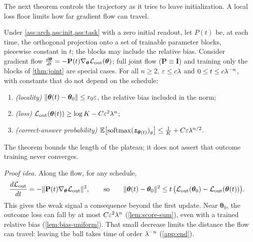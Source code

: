 The next theorem controls the trajectory as it tries to leave initialization. A local loss floor limits how far gradient flow can travel.

\begin{theorem}
\label{thm:outcome-end}
Under \cref{ass:arch,ass:init,ass:task} with a zero initial readout, let $P(t)$ be, at each time, the orthogonal projection onto a set
of trainable parameter blocks, piecewise constant in $t$; the blocks may include the relative bias. Consider gradient flow
$\tfrac{d\bm\theta}{dt}=-\mathbf P(t)\nabla_{\bm\theta}\Lout(\bm\theta)$; full joint flow ($\mathbf P\equiv\mathbf I$) and training only the blocks of \cref{thm:joint} are special cases.
For all $n\ge2$, $\varepsilon\le c\lambda$ and $0\le t\le c\lambda^{-n}$, with constants that do not depend on the schedule:
\begin{enumerate}[label=(\roman*),leftmargin=*,itemsep=0pt,topsep=2pt]
\item \emph{(locality)} $\|\bm\theta(t)-\bm\theta_0\|\le r_0\varepsilon$, the relative bias included in the norm;
\item \emph{(loss)} $\mathcal L_{\mathrm{out}}(\bm\theta(t))\ge\log K-C\varepsilon^2\lambda^n$;
\item \emph{(correct-answer probability)} $\mathbb E\bigl[\operatorname{softmax}(\bm z_{\bm\theta(t)})_y\bigr]\le\frac{1}{K}+C\varepsilon\lambda^{n/2}$.
\end{enumerate}
\end{theorem}
The theorem bounds the length of the plateau; it does not assert that outcome training never converges.

\emph{Proof idea.} Along the flow, for any schedule,
\[
 \frac{d\mathcal L_{\mathrm{out}}}{dt}=-\|\mathbf P(t)\nabla_{\bm\theta}\mathcal L_{\mathrm{out}}\|^2,
 \qquad\text{so}\qquad
 \|\bm\theta(t)-\bm\theta_0\|^2\le t\,\bigl(\mathcal L_{\mathrm{out}}(\bm\theta_0)-\mathcal L_{\mathrm{out}}(\bm\theta(t))\bigr).
\]
This gives the weak signal a consequence beyond the first update. Near $\bm\theta_0$, the outcome loss can fall by at most
$C\varepsilon^2\lambda^n$ (\cref{lem:score-sum}), even with a trained relative bias (\cref{lem:bias-uniform}). That small decrease limits
the distance the flow can travel: leaving the ball takes time of order $\lambda^{-n}$ (\cref{app:end}).

